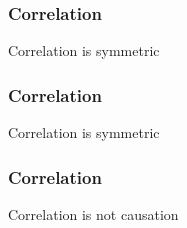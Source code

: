 \documentclass[handout]{beamer}
\begin{document}


   \begin{frame}
   \frametitle{Correlation}
   \begin{center}
   \end{center}
   Correlation is symmetric
   \end{frame}



   \begin{frame}
   \frametitle{Correlation}
   \begin{center}
   \end{center}
   Correlation is symmetric
   \end{frame}



   \begin{frame}
   \frametitle{Correlation}
   \begin{center}
   \end{center}
   Correlation is not causation
   \end{frame}
\end{document}
